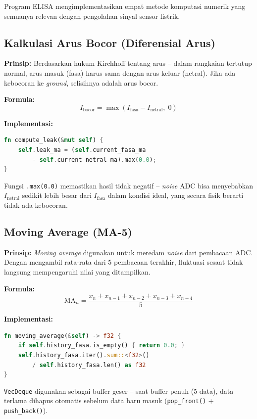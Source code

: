 \documentclass[12pt,a4paper]{article}
\begin{document}
Program ELISA mengimplementasikan empat metode komputasi numerik yang semuanya
relevan dengan pengolahan sinyal sensor listrik.

\subsection{Kalkulasi Arus Bocor (Diferensial Arus)}

\textbf{Prinsip:} Berdasarkan hukum Kirchhoff tentang arus -- dalam rangkaian
tertutup normal, arus masuk (fasa) harus sama dengan arus keluar (netral). Jika
ada kebocoran ke \emph{ground}, selisihnya adalah arus bocor.

\textbf{Formula:}
\[
    I_{\text{bocor}} = \max(I_{\text{fasa}} - I_{\text{netral}},\; 0)
\]

\textbf{Implementasi:}
\begin{lstlisting}[language=Rust, caption={Fungsi compute\_leak}]
fn compute_leak(&mut self) {
    self.leak_ma = (self.current_fasa_ma
        - self.current_netral_ma).max(0.0);
}
\end{lstlisting}

Fungsi \texttt{.max(0.0)} memastikan hasil tidak negatif -- \emph{noise} ADC
bisa menyebabkan $I_{\text{netral}}$ sedikit lebih besar dari $I_{\text{fasa}}$
dalam kondisi ideal, yang secara fisik berarti tidak ada kebocoran.

\subsection{Moving Average (MA-5)}

\textbf{Prinsip:} \emph{Moving average} digunakan untuk meredam \emph{noise}
dari pembacaan ADC. Dengan mengambil rata-rata dari 5 pembacaan terakhir,
fluktuasi sesaat tidak langsung mempengaruhi nilai yang ditampilkan.

\textbf{Formula:}
\[
    \text{MA}_n = \frac{x_n + x_{n-1} + x_{n-2} + x_{n-3} + x_{n-4}}{5}
\]

\textbf{Implementasi:}
\begin{lstlisting}[language=Rust, caption={Fungsi moving\_average}]
fn moving_average(&self) -> f32 {
    if self.history_fasa.is_empty() { return 0.0; }
    self.history_fasa.iter().sum::<f32>()
        / self.history_fasa.len() as f32
}
\end{lstlisting}

\texttt{VecDeque} digunakan sebagai buffer geser -- saat buffer penuh (5 data),
data terlama dihapus otomatis sebelum data baru masuk (\texttt{pop\_front()} +
\texttt{push\_back()}).
\end{document}
